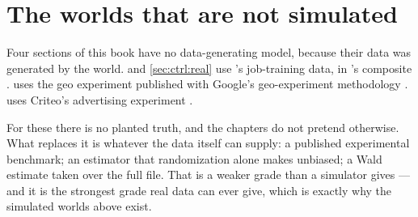 \section{The worlds that are not simulated}
\label{app:dgp:real}

Four sections of this book have no data-generating model, because their data was generated by the
world.  and \cref{sec:ctrl:real} use \citet{lalonde1986}'s job-training data, in
\citeauthor{dehejia1999}'s composite \citep{dehejia1999}.  uses the geo experiment
published with Google's geo-experiment methodology \citep{vaver2011, kerman2017}. 
uses Criteo's advertising experiment \citep{diemert2018}.

For these there is no planted truth, and the chapters do not pretend otherwise. What replaces it is
whatever the data itself can supply: a published experimental benchmark; an estimator that
randomization alone makes unbiased; a Wald estimate taken over the full file. That is a weaker
grade than a simulator gives --- and it is the strongest grade real data can ever give, which is
exactly why the simulated worlds above exist.
